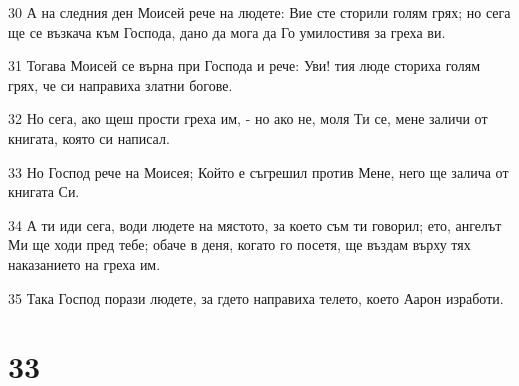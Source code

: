 \par 30 А на следния ден Моисей рече на людете: Вие сте сторили голям грях; но сега ще се възкача към Господа, дано да мога да Го умилостивя за греха ви.
\par 31 Тогава Моисей се върна при Господа и рече: Уви! тия люде сториха голям грях, че си направиха златни богове.
\par 32 Но сега, ако щеш прости греха им, - но ако не, моля Ти се, мене заличи от книгата, която си написал.
\par 33 Но Господ рече на Моисея; Който е съгрешил против Мене, него ще залича от книгата Си.
\par 34 А ти иди сега, води людете на мястото, за което съм ти говорил; ето, ангелът Ми ще ходи пред тебе; обаче в деня, когато го посетя, ще въздам върху тях наказанието на греха им.
\par 35 Така Господ порази людете, за гдето направиха телето, което Аарон изработи.

\chapter{33}

